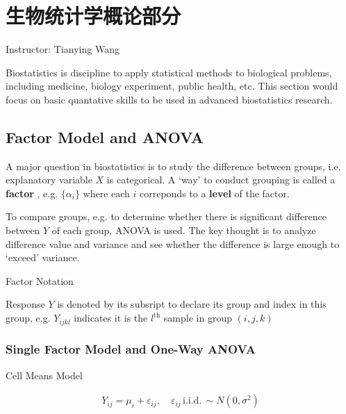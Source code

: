 \chapter{生物统计学概论部分}\label{SectionIntroToBiostatistics}
\begin{center}
    Instructor: Tianying Wang
\end{center}

Biostatistics is discipline to apply statistical methods to biological problems, including medicine, biology experiment, public health, etc. This section would focus on basic quantative skills to be used in advanced biostatistics research.


\section{Factor Model and ANOVA}
A major question in biostatistics is to study the difference between groups, i.e. explanatory variable $ X $ is categorical. A `way' to conduct grouping is called a \textbf{factor} , e.g. $ \{\alpha _i\} $ where each $ i $ correponds to a \textbf{level} of the factor.  

To compare groups, e.g. to determine whether there is significant difference between $ Y $ of each group, ANOVA is used. The key thought is to analyze difference value and variance and see whether the difference is large enough to `exceed' variance.

\begin{point}
    Factor Notation
\end{point}

    Response $ Y $ is denoted by its subsript to declare its group and index in this group, e.g. $ Y_{ijkl} $ indicates it is the $ l^\mathrm{th}  $ sample in group $ (i,j,k) $

\subsection{Single Factor Model and One-Way ANOVA}\label{SubSubSectionIntroToBiostatisticsOneWayANOVA}

\begin{point}
    Cell Means Model
\end{point}

\begin{align}
    Y_{ij}=\mu_i +\varepsilon _{ij},\quad \varepsilon _{ij} \,\mathrm{i.i.d.}\,\sim N(0,\sigma ^2) 
\end{align}

